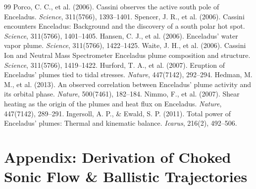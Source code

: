 \documentclass[11pt,a4paper]{article}
\begin{document}
\begin{thebibliography}{99}
 Porco, C. C., et al. (2006). Cassini observes the active south pole of Enceladus. \textit{Science}, 311(5766), 1393--1401.
 Spencer, J. R., et al. (2006). Cassini encounters Enceladus: Background and the discovery of a south polar hot spot. \textit{Science}, 311(5766), 1401--1405.
 Hansen, C. J., et al. (2006). Enceladus' water vapor plume. \textit{Science}, 311(5766), 1422--1425.
 Waite, J. H., et al. (2006). Cassini Ion and Neutral Mass Spectrometer Enceladus plume composition and structure. \textit{Science}, 311(5766), 1419--1422.
 Hurford, T. A., et al. (2007). Eruption of Enceladus' plumes tied to tidal stresses. \textit{Nature}, 447(7142), 292--294.
 Hedman, M. M., et al. (2013). An observed correlation between Enceladus' plume activity and its orbital phase. \textit{Nature}, 500(7461), 182--184.
 Nimmo, F., et al. (2007). Shear heating as the origin of the plumes and heat flux on Enceladus. \textit{Nature}, 447(7142), 289--291.
 Ingersoll, A. P., \& Ewald, S. P. (2011). Total power of Enceladus' plumes: Thermal and kinematic balance. \textit{Icarus}, 216(2), 492--506.
\end{thebibliography}

\appendix
\section*{Appendix: Derivation of Choked Sonic Flow \& Ballistic Trajectories}
\end{document}
